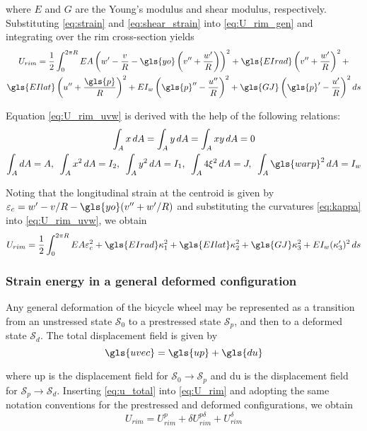 \documentclass[\rootdir/thesis.tex]{subfiles}
\begin{document}
where $E$ and $G$ are the Young's modulus and shear modulus, respectively. Substituting \eqref{eq:strain} and \eqref{eq:shear_strain} into \eqref{eq:U_rim_gen} and integrating over the rim cross-section yields
\begin{multline}
\label{eq:U_rim_uvw}
U_{rim} = \frac{1}{2}\int_0^{2\pi R}
	EA\left(w' - \frac{v}{R} - \gls{yo}\left(v'' + \frac{w'}{R}\right) \right)^2 +
	\gls{EIrad} \left(v'' + \frac{w'}{R}\right)^2 +\\
	\gls{EIlat} \left(u'' + \frac{\gls{p}}{R}\right)^2 +
	EI_w\left(\gls{p}'' - \frac{u''}{R}\right)^2 +
	\gls{GJ}\left(\gls{p}' - \frac{u'}{R}\right)^2 ds
\end{multline}

Equation \eqref{eq:U_rim_uvw} is derived with the help of the following relations:
\begin{gather}
\int_A x\, dA = \int_A y\, dA = \int_A xy\, dA = 0\\
\int_A dA = A,\,\,\, \int_A x^2\, dA = I_2,\,\,\, \int_A y^2\, dA = I_1,\,\,\,
\int_A 4\xi^2\, dA = J,\,\,\, \int_A \gls{warp}^2\, dA = I_w
\end{gather}

Noting that the longitudinal strain at the centroid is given by $\varepsilon_c = w' - v/R - \gls{yo}(v'' + w'/R)$ and substituting the curvatures \eqref{eq:kappa} into \eqref{eq:U_rim_uvw}, we obtain
\begin{equation}
\label{eq:U_rim}
U_{rim} = \frac{1}{2}\int_0^{2\pi R} EA\varepsilon_c^2 + \gls{EIrad}\kappa_1^2 + \gls{EIlat}\kappa_2^2 + \gls{GJ}\kappa_3^2 + EI_w(\kappa_3')^2\, ds
\end{equation}

\subsubsection{Strain energy in a general deformed configuration}

Any general deformation of the bicycle wheel may be represented as a transition from an unstressed state $\mathcal{S}_0$ to a prestressed state $\mathcal{S}_p$, and then to a deformed state $\mathcal{S}_d$. The total displacement field is given by
\begin{equation}
\label{eq:u_total}
\gls{uvec} = \gls{up} + \gls{du}
\end{equation}

where \gls{up} is the displacement field for $\mathcal{S}_0 \rightarrow \mathcal{S}_p$ and \gls{du} is the displacement field for $\mathcal{S}_p \rightarrow \mathcal{S}_d$. Inserting \eqref{eq:u_total} into \eqref{eq:U_rim} and adopting the same notation conventions for the prestressed and deformed configurations, we obtain
\begin{equation}
\label{eq:U_rim_total}
U_{rim} = U_{rim}^p + \delta U_{rim}^{p\delta} + U_{rim}^{\delta}
\end{equation}
\end{document}
